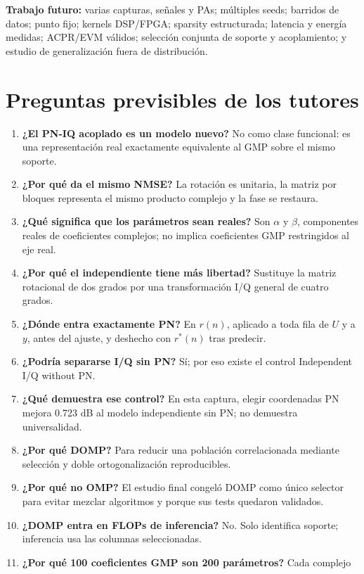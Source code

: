 \documentclass[10pt,a4paper]{article}
\begin{document}
\textbf{Trabajo futuro:} varias capturas, señales y PAs; múltiples seeds;
barridos de datos; punto fijo; kernels DSP/FPGA; sparsity estructurada; latencia y
energía medidas; ACPR/EVM válidos; selección conjunta de soporte y acoplamiento;
y estudio de generalización fuera de distribución.

\section{Preguntas previsibles de los tutores}

\begin{enumerate}[leftmargin=*,label=\textbf{\arabic*.}]
\item \textbf{¿El PN-IQ acoplado es un modelo nuevo?} No como clase funcional:
es una representación real exactamente equivalente al GMP sobre el mismo soporte.
\item \textbf{¿Por qué da el mismo NMSE?} La rotación es unitaria, la matriz por
bloques representa el mismo producto complejo y la fase se restaura.
\item \textbf{¿Qué significa que los parámetros sean reales?} Son $\alpha$ y
$\beta$, componentes reales de coeficientes complejos; no implica coeficientes
GMP restringidos al eje real.
\item \textbf{¿Por qué el independiente tiene más libertad?} Sustituye la matriz
rotacional de dos grados por una transformación I/Q general de cuatro grados.
\item \textbf{¿Dónde entra exactamente PN?} En $r(n)$, aplicado a toda fila de
$U$ y a $y$, antes del ajuste, y deshecho con $r^*(n)$ tras predecir.
\item \textbf{¿Podría separarse I/Q sin PN?} Sí; por eso existe el control
Independent I/Q without PN.
\item \textbf{¿Qué demuestra ese control?} En esta captura, elegir coordenadas PN
mejora 0.723 dB al modelo independiente sin PN; no demuestra universalidad.
\item \textbf{¿Por qué DOMP?} Para reducir una población correlacionada mediante
selección y doble ortogonalización reproducibles.
\item \textbf{¿Por qué no OMP?} El estudio final congeló DOMP como único selector
para evitar mezclar algoritmos y porque sus tests quedaron validados.
\item \textbf{¿DOMP entra en FLOPs de inferencia?} No. Solo identifica soporte;
inferencia usa las columnas seleccionadas.
\item \textbf{¿Por qué 100 coeficientes GMP son 200 parámetros?} Cada complejo

\end{enumerate}
\end{document}
